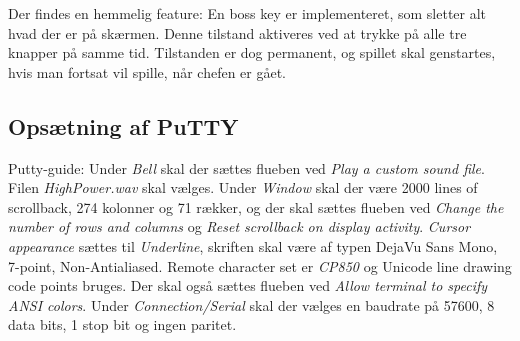 Der findes en hemmelig feature: En boss key er implementeret, som sletter alt hvad der er på skærmen. Denne tilstand aktiveres ved at trykke på alle tre knapper på samme tid. Tilstanden er dog permanent, og spillet skal genstartes, hvis man fortsat vil spille, når chefen er gået. 

\subsection{Opsætning af PuTTY}
Putty-guide:
Under \textit{Bell}  skal der sættes flueben ved \textit{Play a custom sound file}. Filen \textit{HighPower.wav} skal vælges. Under \textit{Window} skal der være 2000 lines of scrollback, 274 kolonner og 71 rækker, og der skal sættes flueben ved \textit{Change the number of rows and columns} og \textit{Reset scrollback on display activity}. 
\textit{Cursor appearance} sættes til \textit{Underline}, skriften skal være af typen DejaVu Sans Mono, 7-point, Non-Antialiased. Remote character set er \textit{CP850} og Unicode line drawing code points bruges. Der skal også sættes flueben ved \textit{Allow terminal to specify ANSI colors}.
Under \textit{Connection/Serial} skal der vælges en baudrate på 57600, 8 data bits, 1 stop bit og ingen paritet.